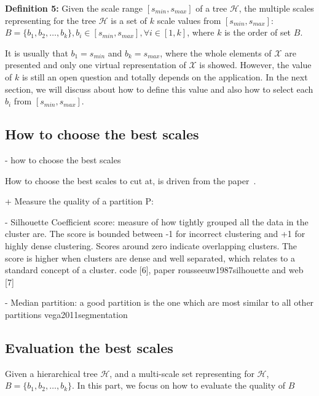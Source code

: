\textbf{Definition 5:} Given the scale range $[s_{min},s_{max}]$ of a tree $\mathcal{H}$, the multiple scales representing for the tree $\mathcal{H}$ is a set of $k$ scale values from $[s_{min},s_{max}]$: $\mathsf{\textit{B}} = \{b_1, b_2, \ldots, b_k\}, b_i \in [s_{min},s_{max}], \forall i \in [1,k]$, where $k$ is the order of set $\mathsf{\textit{B}}$.

It is usually that $b_1 = s_{min}$ and $b_k = s_{max}$, where the whole elements of $\mathcal{X}$ are presented and only one virtual representation of $\mathcal{X}$ is showed. However, the value of $k$ is still an open question and totally depends on the application. In the next section, we will discuss about how to define this value and also how to select each $b_i$ from $[s_{min},s_{max}]$.

\subsection{How to choose the best scales}
\label{subsec:choosing_scales}

- how to choose the best scales 

How to choose the best scales to cut at, is driven from the paper~\cite{pons2011postprocessing}.

 
+ Measure the quality of a partition P:

- Silhouette Coefficient score: measure of how tightly grouped all the data in the cluster are. The score is bounded between -1 for incorrect clustering and +1 for highly dense clustering. Scores around zero indicate overlapping clusters. The score is higher when clusters are dense and well separated, which relates to a standard concept of a cluster. code [6], paper rousseeuw1987silhouette and web [7]

- Median partition: a good partition is the one which are most similar to all other partitions vega2011segmentation

\subsection{Evaluation the best scales}
\label{subsec:evaluation_scales}

Given a hierarchical tree $\mathcal{H}$, and a multi-scale set representing for $\mathcal{H}$, $\mathsf{\textit{B}} = \{b_1, b_2, \ldots, b_k\}$. In this part, we focus on how to evaluate the quality of $\mathsf{\textit{B}}$

